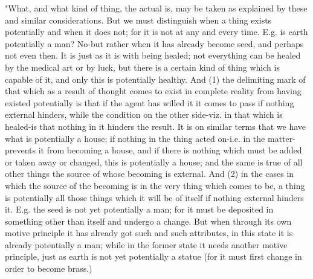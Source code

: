 "What, and what kind of thing, the actual is, may be taken as explained
by these and similar considerations. But we must distinguish when
a thing exists potentially and when it does not; for it is not at
any and every time. E.g. is earth potentially a man? No-but rather
when it has already become seed, and perhaps not even then. It is
just as it is with being healed; not everything can be healed by the
medical art or by luck, but there is a certain kind of thing which
is capable of it, and only this is potentially healthy. And (1) the
delimiting mark of that which as a result of thought comes to exist
in complete reality from having existed potentially is that if the
agent has willed it it comes to pass if nothing external hinders,
while the condition on the other side-viz. in that which is healed-is
that nothing in it hinders the result. It is on similar terms that
we have what is potentially a house; if nothing in the thing acted
on-i.e. in the matter-prevents it from becoming a house, and if there
is nothing which must be added or taken away or changed, this is potentially
a house; and the same is true of all other things the source of whose
becoming is external. And (2) in the cases in which the source of
the becoming is in the very thing which comes to be, a thing is potentially
all those things which it will be of itself if nothing external hinders
it. E.g. the seed is not yet potentially a man; for it must be deposited
in something other than itself and undergo a change. But when through
its own motive principle it has already got such and such attributes,
in this state it is already potentially a man; while in the former
state it needs another motive principle, just as earth is not yet
potentially a statue (for it must first change in order to become
brass.) 

